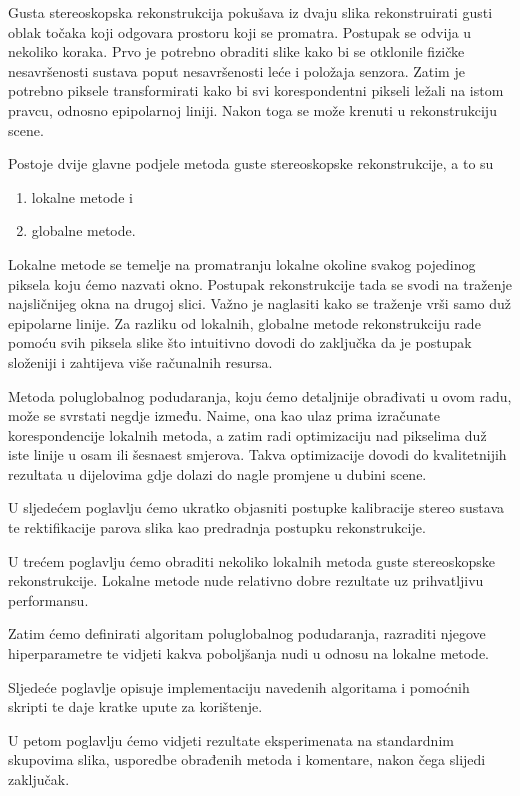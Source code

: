 \documentclass[utf8, zavrsni, numeric]{fer}
\begin{document}
Gusta stereoskopska rekonstrukcija pokušava iz dvaju slika rekonstruirati gusti oblak točaka koji
odgovara prostoru koji se promatra. Postupak se odvija u nekoliko koraka.
Prvo je potrebno obraditi slike kako bi se otklonile fizičke nesavršenosti sustava poput nesavršenosti leće i položaja senzora. Zatim je potrebno piksele
transformirati kako bi svi korespondentni pikseli ležali na istom pravcu, odnosno epipolarnoj liniji. Nakon toga se može krenuti u rekonstrukciju scene.

Postoje dvije glavne podjele metoda guste stereoskopske rekonstrukcije, a to su
\begin{enumerate}
  \item lokalne metode i
  \item globalne metode.
\end{enumerate}

Lokalne metode se temelje na promatranju lokalne okoline svakog pojedinog piksela koju ćemo nazvati okno.
Postupak rekonstrukcije tada se svodi na traženje najsličnijeg okna na drugoj slici. Važno je naglasiti kako se traženje vrši samo duž epipolarne linije.
Za razliku od lokalnih, globalne metode rekonstrukciju rade pomoću svih piksela slike što intuitivno dovodi do zaključka da je postupak složeniji i zahtijeva više računalnih resursa.

Metoda poluglobalnog podudaranja, koju ćemo detaljnije obrađivati u ovom radu, može se svrstati negdje između. Naime, ona kao ulaz prima izračunate korespondencije lokalnih metoda, a zatim radi optimizaciju nad pikselima duž iste linije u osam ili šesnaest smjerova.
Takva optimizacije dovodi do kvalitetnijih rezultata u dijelovima gdje dolazi do nagle promjene u dubini scene.

U sljedećem poglavlju ćemo ukratko objasniti postupke kalibracije stereo sustava te rektifikacije parova slika kao predradnja postupku rekonstrukcije.

U trećem poglavlju ćemo obraditi nekoliko lokalnih metoda guste stereoskopske rekonstrukcije. Lokalne metode nude relativno dobre rezultate uz prihvatljivu performansu.

Zatim ćemo definirati algoritam poluglobalnog podudaranja, razraditi njegove hiperparametre te vidjeti kakva poboljšanja nudi u odnosu na lokalne metode.

Sljedeće poglavlje opisuje implementaciju navedenih algoritama i pomoćnih skripti te daje kratke upute za korištenje.

U petom poglavlju ćemo vidjeti rezultate eksperimenata na standardnim skupovima slika, usporedbe obrađenih metoda i komentare, nakon čega slijedi zaključak.
\end{document}
